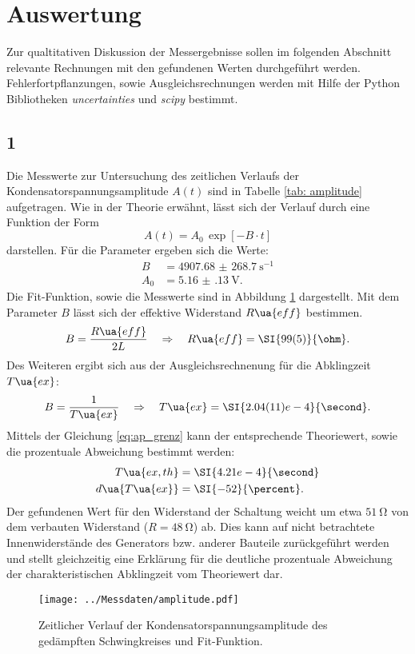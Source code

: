 \section{Auswertung}
Zur qualtitativen Diskussion der Messergebnisse sollen im folgenden Abschnitt relevante Rechnungen mit den gefundenen
Werten durchgeführt werden. Fehlerfortpflanzungen, sowie Ausgleichsrechnungen werden mit
Hilfe der Python Bibliotheken \emph{uncertainties}\cite{uncertainties} und \emph{scipy}\cite{scipy} bestimmt.
\subsection{1}
Die Messwerte zur Untersuchung des zeitlichen Verlaufs der Kondensatorspannungsamplitude $A(t)$ sind in Tabelle \ref{tab: amplitude} aufgetragen. Wie in der Theorie erwähnt,
lässt sich der Verlauf durch eine Funktion der Form
\begin{equation}
  A(t) = A_0 \, \exp[-B\cdot t]
\end{equation}
darstellen. Für die Parameter ergeben sich die Werte:
\begin{align}
  B &= \SI{4907.68(26870)}{\second^{-1}}\\
  A_0 &= \SI{5.16(13)}{\volt}.
\end{align}
Die Fit-Funktion, sowie die Messwerte sind in Abbildung \ref{fig: amplitude} dargestellt.
Mit dem Parameter $B$ lässt sich der effektive Widerstand $R\ua{eff}$ bestimmen.
\begin{equation}
  B = \frac{R\ua{eff}}{2L} \quad \Rightarrow \quad R\ua{eff} =  \SI{99(5)}{\ohm}.
  \label{eq: Fitparameter}
\end{equation}
Des Weiteren ergibt sich aus der Ausgleichsrechnenung für die Abklingzeit $T\ua{ex}$:
\begin{equation}
  B = \frac{1}{T\ua{ex}} \quad \Rightarrow \quad T\ua{ex} =  \SI{2.04(11)e-4}{\second}.
\end{equation}
Mittels der Gleichung \eqref{eq:ap_grenz} kann der entsprechende Theoriewert, sowie die prozentuale Abweichung bestimmt werden:
\begin{align}
  \begin{aligned}
  T\ua{ex, th} &= \SI{4.21e-4}{\second}\\
  d\ua{T\ua{ex}} &= \SI{-52}{\percent}.
\end{aligned}
\label{eq: theo_breite}
\end{align}
Der gefundenen Wert für den
Widerstand der Schaltung weicht um etwa $\SI{51}{\ohm}$ von dem verbauten Widerstand ($R =  \SI{48}{\ohm}$) ab. Dies kann
auf nicht betrachtete Innenwiderstände des Generators bzw. anderer Bauteile zurückgeführt werden und stellt
gleichzeitig eine Erklärung für die deutliche prozentuale Abweichung der charakteristischen Abklingzeit vom Theoriewert dar.

\begin{figure}
  \centering
  \texttt{[image: ../Messdaten/amplitude.pdf]}
  \caption{Zeitlicher Verlauf der Kondensatorspannungsamplitude des gedämpften Schwingkreises und Fit-Funktion.}
  \label{fig: amplitude}
\end{figure}


